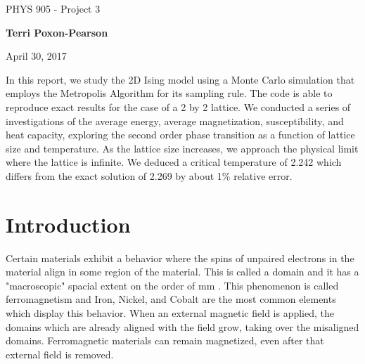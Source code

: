 \documentclass[%
oneside,                 %
final,                   %
10pt]{article}
\begin{document}

\newcommand{\exercisesection}[1]{\subsection*{#1}}






\thispagestyle{empty}

\begin{center}
{\LARGE\bf
\begin{spacing}{1.25}
PHYS 905 - Project 3
\end{spacing}
}
\end{center}


\begin{center}
{\bf Terri Poxon-Pearson}
\end{center}

    

\begin{center}
April 30, 2017
\end{center}

\vspace{1cm}

In this report, we study the 2D Ising model using a Monte Carlo simulation that employs the Metropolis Algorithm for its sampling rule.  The code is able to reproduce exact results for the case of a 2 by 2 lattice. We conducted a series of investigations of the average energy, average magnetization, susceptibility, and heat capacity,  exploring the second order phase transition as a function of lattice size and temperature.  As the lattice size increases, we approach the physical limit where the lattice is infinite.  We deduced a critical temperature of 2.242 which differs from the exact solution of 2.269 by about 1$\%$ relative error.

\tableofcontents
 
\section{Introduction}

Certain materials exhibit a behavior where the spins of unpaired electrons in the material align in some region of the material.  This is called a domain and it has a "macroscopic" spacial extent on the order of mm \cite{LectureNotes}.  This phenomenon is called ferromagnetism and Iron, Nickel, and Cobalt are the most common elements which display this behavior.  When an external magnetic field is applied, the domains which are already aligned with the field grow, taking over the misaligned domains.  Ferromagnetic materials can remain magnetized, even after that external field is removed.
\end{document}
